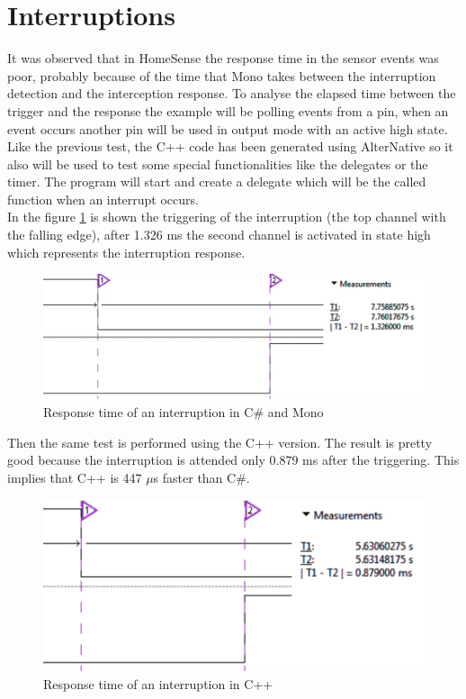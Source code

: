 \section{Interruptions}\label{S:Performance-Interruptions}
It was observed that in HomeSense the response time in the sensor events was poor, probably because of the time that Mono takes between the interruption detection and the interception response. To analyse the elapsed time between the trigger and the response the example will be polling events from a pin, when an event occurs another pin  will be used in output mode with an active high state.
\\
Like the previous test, the C++ code has been generated using AlterNative so it also will be used to test some special functionalities like the delegates or the timer. The program will start and create a delegate which will be the called function when an interrupt occurs.
\\
In the figure \ref{fig:interrupt-csharp} is shown the triggering of the interruption (the top channel with the falling edge), after 1.326 ms the second channel is activated in state high which represents the interruption response.
\begin{figure}[H]\begin{center}
 \centering
  \captionsetup{justification=centering}
  \includegraphics[scale=0.65]{pictures/performance-tests/Interruptions/csharp}
  \caption{Response time of an interruption in C\# and Mono\label{fig:interrupt-csharp}}
\end{center}\end{figure}
Then the same test is performed using the C++ version. The result is pretty good because the interruption is attended only 0.879 ms after the triggering. This implies that C++ is 447 $\mu$s faster than C\#.
\begin{figure}[H]\begin{center}
 \centering
  \captionsetup{justification=centering}
  \includegraphics[scale=0.65]{pictures/performance-tests/Interruptions/cxx}
  \caption{Response time of an interruption in C++\label{fig:interrupt-cxx}}
\end{center}\end{figure}
